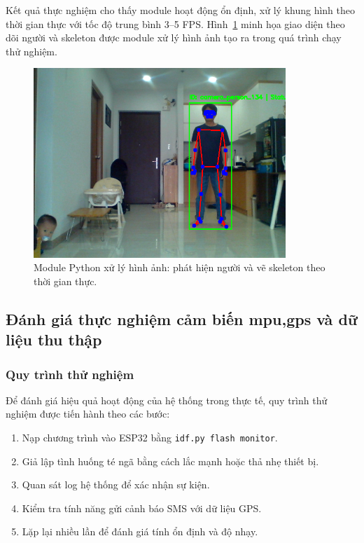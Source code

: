 Kết quả thực nghiệm cho thấy module hoạt động ổn định, xử lý khung hình theo thời gian thực với tốc độ trung bình 3--5 FPS.  
Hình~\ref{fig:python_skeleton} minh họa giao diện theo dõi người và skeleton được module xử lý hình ảnh tạo ra trong quá trình chạy thử nghiệm.

\begin{figure}[H]
    \centering
    \includegraphics[width=0.85\textwidth]{figures/fall_detection_screen_shoot.png}
    \caption{Module Python xử lý hình ảnh: phát hiện người và vẽ skeleton theo thời gian thực.}
    \label{fig:python_skeleton}
\end{figure}

\subsection{Đánh giá thực nghiệm cảm biến mpu,gps và dữ liệu thu thập}
\subsubsection*{Quy trình thử nghiệm}
Để đánh giá hiệu quả hoạt động của hệ thống trong thực tế, quy trình thử nghiệm được tiến hành theo các bước:
\begin{enumerate}
    \item Nạp chương trình vào ESP32 bằng \texttt{idf.py flash monitor}.  
    \item Giả lập tình huống té ngã bằng cách lắc mạnh hoặc thả nhẹ thiết bị.  
    \item Quan sát log hệ thống để xác nhận sự kiện.  
    \item Kiểm tra tính năng gửi cảnh báo SMS với dữ liệu GPS.  
    \item Lặp lại nhiều lần để đánh giá tính ổn định và độ nhạy.
\end{enumerate}


